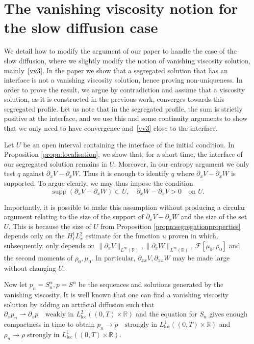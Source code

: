 \documentclass[a4paper,twosided, 11pt]{article}
\newcommand{\R}{\mathbb{R}}
\theoremstyle{plain}
\theoremstyle{remark}
\numberwithin{equation}{section}
\begin{document}
\appendix

\section{The vanishing viscosity notion for the slow diffusion case}\label{app:porous_medium}

We detail how to modify the argument of our paper to handle the case of the slow diffusion, where we slightly modify the notion of vanishing viscosity solution, mainly~\ref{vv3}. In the paper we show that a segregated solution that has an interface is not a vanishing viscosity solution, hence proving non-uniqueness. In order to prove the result, we argue by contradiction and assume that a viscosity solution, as it is constructed in the previous work, converges towards this segregated profile. Let us note that in the segregated profile, the sum is strictly positive at the interface, and we use this and some continuity arguments to show that we only need to have convergence and~\ref{vv3} close to the interface.

\medskip 

Let $U$ be  an open interval containing the interface of the initial condition. 
In Proposition \ref{propn:localisation}, we show that, for a short time, the interface of our segregated solution remains in $U$.
Moreover, in our entropy argument we only test $q$ against $\partial_x V-\partial_x W$. 
Thus it is enough to identify $q$ where $\partial_x V-\partial_x W$ is supported.
To argue clearly, we may thus impose the condition
$$
\operatorname{supp}(\partial_x V-\partial_x W)\subset U,
\quad \partial_x W-\partial_x V>0 \quad\text{on }U.
$$

Importantly, it is possible to make this assumption without producing a circular argument relating to the size of the support of $\partial_xV -\partial_x W$ and the size of the set $U$.
This is because the size of $U$ from Proposition \ref{propn:segregationproperties} depends only on the $H^1_tL^2_x$ estimate for the function $u$ proven in \cite[Lemma 6.2]{santambrogioschulz2026segregated} which, subsequently, only depends on $\|\partial_x V\|_{L^\infty(\R)}, \|\partial_x W\|_{L^\infty(\R)}$, $\mathcal{F}[\mu_0,\rho_0]$ and the second moments of $\rho_0,\mu_0$. 
In particular, $\partial_{xx}V, \partial_{xx}W$ may be made large without changing $U$.

\medskip 

Now let $p_n=S_n^\alpha, p=S^\alpha $ be the sequences and solutions generated by the vanishing viscosity. 
It is well known that one can find a vanishing viscosity solution by adding an artificial diffusion such that $\partial_xp_n \rightharpoonup \partial_xp \quad\text{weakly in }L^2_{\mathrm{loc}}((0,T)\times\mathbb R)$
and the equation for $S_n$ gives enough compactness in time to obtain
$p_n\to p
\quad\text{strongly in }L^1_{\mathrm{loc}}((0,T)\times\mathbb R)$ and $\rho_n\to \rho$ strongly in $L^1_{\mathrm{loc}}((0,T)\times\mathbb R)$.
\end{document}
